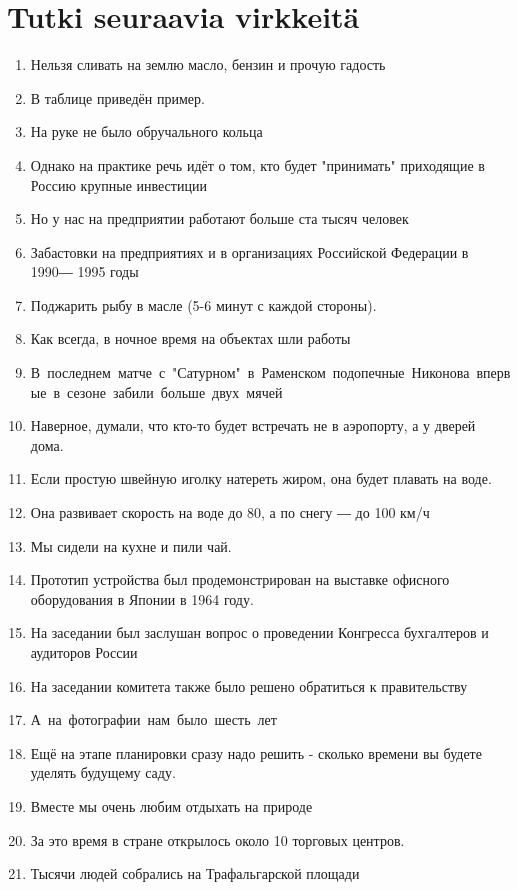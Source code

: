 \documentclass[paper=a4, fontsize=11pt]{scrartcl}
\begin{document}
\section{Tutki seuraavia virkkeitä}

\begin{enumerate}
    \item Нельзя сливать на землю масло, бензин и прочую гадость
    \item В таблице приведён пример.
    \item На руке не было обручального кольца
    \item Однако на практике речь идёт о том, кто будет "принимать" приходящие в Россию крупные инвестиции
    \item Но у нас на предприятии работают больше ста тысяч человек
    \item Забастовки на предприятиях и в организациях Российской Федерации в 1990― 1995 годы
    \item Поджарить рыбу в масле (5-6 минут с каждой стороны).
    \item Как всегда, в ночное время на объектах шли работы
    \item В последнем матче с "Сатурном" в Раменском подопечные Никонова впервые в сезоне забили больше двух мячей
    \item Наверное, думали, что кто-то будет встречать не в аэропорту, а у дверей дома.
    \item Если простую швейную иголку натереть жиром, она будет плавать на воде.
    \item Она развивает скорость на воде до 80, а по снегу ― до 100 км/ч
    \item Мы сидели на кухне и пили чай.
    \item Прототип устройства был продемонстрирован на выставке офисного оборудования в Японии в 1964 году.
    \item На заседании был заслушан вопрос о проведении Конгресса бухгалтеров и аудиторов России
    \item На заседании комитета также было решено обратиться к правительству
    \item А на фотографии нам было шесть лет
    \item Ещё на этапе планировки сразу надо решить - сколько времени вы будете уделять будущему саду.
    \item Вместе мы очень любим отдыхать на природе
    \item За это время в стране открылось около 10 торговых центров.
    \item Тысячи людей собрались на Трафальгарской площади

\end{enumerate}
\end{document}
